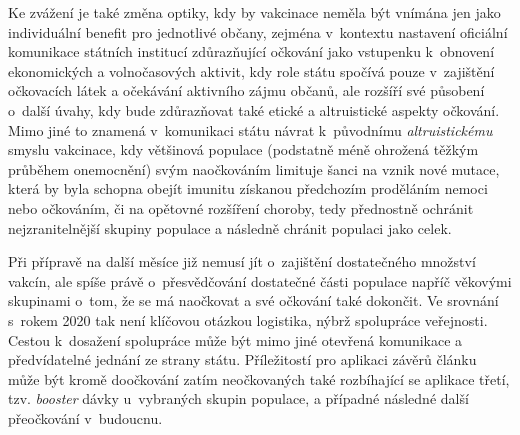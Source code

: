 Ke zvážení je také změna optiky, kdy by vakcinace neměla být vnímána jen jako individuální benefit pro jednotlivé občany, zejména v~kontextu nastavení oficiální komunikace státních institucí zdůrazňující očkování jako vstupenku k~obnovení ekonomických a volnočasových aktivit, kdy role státu spočívá pouze v~zajištění očkovacích látek a očekávání aktivního zájmu občanů, ale rozšíří své působení o~další úvahy, kdy bude zdůrazňovat také etické a altruistické aspekty očkování. %
Mimo jiné to znamená v~komunikaci státu návrat k~původnímu \emph{altruistickému} smyslu vakcinace, kdy většinová populace (podstatně méně ohrožená těžkým průběhem onemocnění) svým naočkováním limituje šanci na vznik nové mutace, která by byla schopna obejít imunitu získanou předchozím proděláním nemoci nebo očkováním, či na opětovné rozšíření choroby, tedy přednostně ochránit nejzranitelnější skupiny populace a ná\-sled\-ně chránit populaci jako celek. 


Při přípravě na další měsíce již nemusí jít o~zajištění dostatečného množství vakcín, ale spíše právě o~přesvědčování dostatečné části populace napříč věkovými skupinami o~tom, že se má naočkovat a své očkování také dokončit. Ve srovnání s~rokem 2020 tak není klíčovou otázkou logistika, nýbrž spolupráce veřejnosti. Cestou k~dosažení spolupráce může být mimo jiné otevřená komunikace a předvídatelné jednání ze strany státu. Příležitostí pro aplikaci závěrů článku může být kromě doočkování zatím neočkovaných také rozbíhající se aplikace třetí, tzv. \emph{booster} dávky u~vybraných skupin populace, a případné následné další přeočkování v~budoucnu. 







